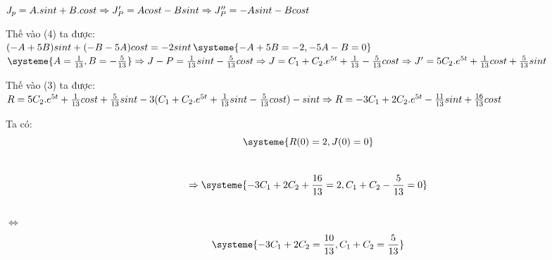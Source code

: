    $
    J_p = A.sint+B.cost \\
    \Rightarrow J'_P = Acost - Bsint \\
    \Rightarrow J''_P = -Asint - Bcost \\
    $

    Thế vào (4) ta được:\\

    $
    (-A+5B)sint+(-B-5A)cost=-2sint \\
    $\Longleftrightarrow$
    \begin{equation}
        \systeme{
            -A+5B=-2,
            -5A-B=0
        }\label{eq:equation2}
    \end{equation} \\
    $\Longleftrightarrow$
    \begin{equation}
        \systeme{
            A = \frac{1}{13},
            B = -\frac{5}{13}
        }\label{eq:equation2}
    \end{equation} \\
    \Rightarrow J-P = \frac{1}{13}sint - \frac{5}{13}cost \\
    \Rightarrow J = C_1 + C_2.e^{5t} + \frac{1}{13} - \frac{5}{13}cost \\
    \Rightarrow J' = 5C_2.e^{5t} + \frac{1}{13}cost + \frac{5}{13}sint \\
    $

    Thế vào (3) ta được: \\
    $
    R = 5C_2.e^{5t}+\frac{1}{13}cost+\frac{5}{13}sint-3(C_1+C_2.e^{5t}+\frac{1}{13}sint - \frac{5}{13}cost)-sint \\
    \Rightarrow R = -3C_1 + 2C_2.e^{5t}-\frac{11}{13}sint + \frac{16}{13}cost \\
    $

    Ta có: \\

    \begin{equation}
        \systeme{
            R(0) = 2,
            J(0) = 0
        }\label{eq:equation2}
    \end{equation} \\

    \begin{equation}
        \Rightarrow
        \systeme{
            -3C_1 + 2C_2 + \frac{16}{13} = 2,
            C_1 + C_2 - \frac{5}{13} = 0
        }\label{eq:equation2}
    \end{equation} \\

    $\Longleftrightarrow$
    \begin{equation}
        \systeme{
            -3C_1+2C_2=\frac{10}{13},
            C_1 + C_2 = \frac{5}{13}
        }\label{eq:equation2}
    \end{equation} \\

